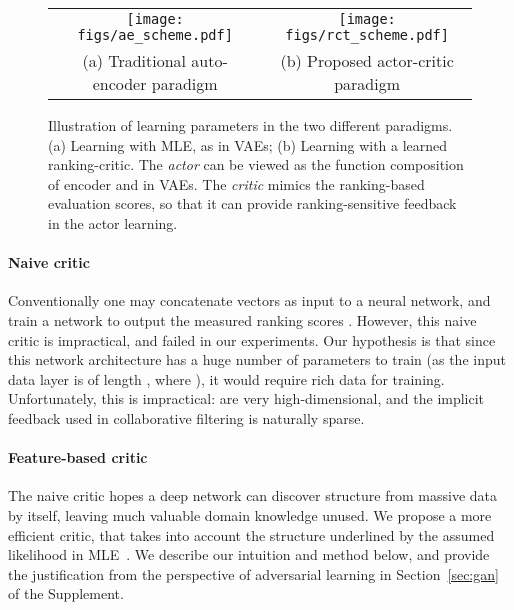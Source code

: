 \documentclass{article} \usepackage{iclr2020_conference,times}
\begin{document}
\begin{figure*}[t!]\vspace{-0mm}\centering
	\begin{tabular}{c c}		
		\hspace{-0mm}
		\texttt{[image: figs/ae\_scheme.pdf]} &
		\hspace{0mm}
		\texttt{[image: figs/rct\_scheme.pdf]} \\
		(a) Traditional auto-encoder paradigm \vspace{-0mm}   & 
		(b) Proposed actor-critic paradigm \hspace{-0mm} 
	\end{tabular}
	\vspace{-1mm}
	\caption{Illustration of learning parameters  in the two different paradigms. (a) Learning with MLE, as in VAEs; (b) Learning with a learned ranking-critic. The {\it actor} can be viewed as the function composition of encoder  and  in VAEs. The {\it critic} mimics the ranking-based evaluation scores, so that it can provide ranking-sensitive feedback in the actor learning.}
	\vspace{-5mm}
	\label{fig:schemes}
\end{figure*}



\paragraph{Naive critic}
Conventionally one may concatenate vectors  as input to a neural network, and train a network to output the measured ranking scores .
However, this naive critic is impractical, and failed in our experiments. Our hypothesis is that since this network architecture has a huge number of parameters to train (as the input data layer is of length , where ), it would require rich data for training. Unfortunately, this is impractical:  are very high-dimensional, and the implicit feedback used in collaborative filtering is naturally sparse.

\vspace{-0mm}
\paragraph{Feature-based critic}
The naive critic hopes a deep network can discover structure from massive data by itself, leaving much valuable domain knowledge unused.
We propose a more efficient critic, that takes into account the structure underlined by the assumed likelihood in MLE~\citep{miyato2018cgans}. We describe our intuition and method below, and provide the justification from the perspective of adversarial learning in Section~\ref{sec:gan} of the Supplement. 
\end{document}
